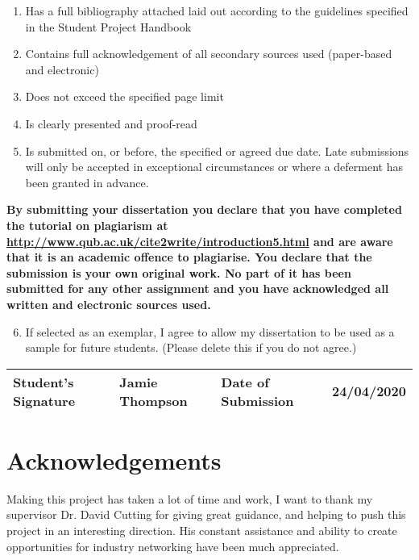 \begin{enumerate}
    \item Has a full bibliography attached laid out according to the guidelines
    specified in the Student Project Handbook
    \item Contains full acknowledgement of all secondary sources used (paper-based and electronic)
    \item Does not exceed the specified page limit
    \item Is clearly presented and proof-read
    \item Is submitted on, or before, the specified or agreed due date. Late
    submissions will only be accepted in exceptional circumstances or where a
    deferment has been granted in advance.
\end{enumerate}

\textbf{
By submitting your dissertation you declare that you have completed the tutorial
on plagiarism at \url{http://www.qub.ac.uk/cite2write/introduction5.html} and
are aware that it is an academic offence to plagiarise.  You declare that the
submission is your own original work. No part of it has been submitted for any
other assignment and you have acknowledged all written and electronic sources
used.}

\begin{enumerate}
    \setcounter{enumi}{5}
    \item If selected as an exemplar, I agree to allow my dissertation to be
    used as a sample for future students. (Please delete this if you do not
    agree.)
\end{enumerate}

\begin{table}[h]
\centering
\begin{tabular}{|l|l|l|l|}
\hline
Student's Signature & Jamie Thompson & Date of Submission & 24/04/2020 \\ \hline
\end{tabular}
\end{table}

\newpage

\section*{Acknowledgements}

Making this project has taken a lot of time and work, I want to thank my
supervisor Dr. David Cutting for giving great guidance, and helping to push this
project in an interesting direction. His constant assistance and ability to
create opportunities for industry networking have been much appreciated.  

